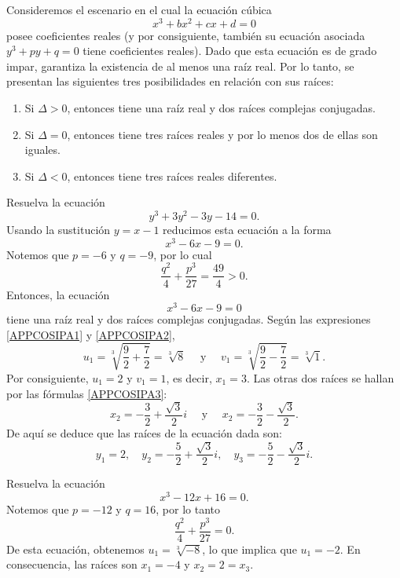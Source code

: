 \begin{observation}
    Consideremos el escenario en el cual la ecuación cúbica
    $$x^3+bx^2+cx+d=0$$
    posee coeficientes reales (y por consiguiente, también su ecuación asociada $y^3 + py + q=0$ tiene coeficientes reales). Dado que esta ecuación es de grado impar, garantiza la existencia de al menos una raíz real. Por lo tanto, se presentan las siguientes tres posibilidades en relación con sus raíces:\newpage
    \begin{enumerate}[label=\roman*.]
        \item Si $\Delta >0$, entonces tiene una raíz real y dos raíces complejas conjugadas.
        \item Si $\Delta =0$, entonces tiene tres raíces reales y por lo menos dos de ellas son iguales.
        \item Si $\Delta <0$, entonces tiene tres raíces reales diferentes.
    \end{enumerate}
\end{observation}

\begin{example}
    Resuelva la ecuación
    $$y^3+3y^2-3y-14=0.$$
    \solucion Usando la sustitución $y=x-1$ reducimos esta ecuación a la forma
    $$x^3-6x-9=0.$$
    Notemos que $p=-6$ y $q=-9$, por lo cual
    $$\frac{q^2}{4}+\frac{p^3}{27}=\frac{49}{4}>0.$$
    Entonces, la ecuación
    $$x^3-6x-9=0$$
    tiene una raíz real y dos raíces complejas conjugadas. Según las expresiones \eqref{APPCOSIPA1} y \eqref{APPCOSIPA2},
    $$u_1=\sqrt[3]{\frac{9}{2}+\frac{7}{2}}=\sqrt[3]{8} \quad \text{ y } \quad v_1=\sqrt[3]{\frac{9}{2}-\frac{7}{2}}=\sqrt[3]{1}.$$
    Por consiguiente, $u_1=2$ y $v_1=1$, es decir, $x_1=3$. Las otras dos raíces se hallan por las fórmulas \eqref{APPCOSIPA3}:
    $$x_2 = - \frac{3}{2} + \frac{\sqrt{3}}{2}i \quad \text{ y } \quad x_2 = - \frac{3}{2} - \frac{\sqrt{3}}{2}.$$
    De aquí se deduce que las raíces de la ecuación dada son:
    $$y_1 = 2, \quad y_2 = - \frac{5}{2} + \frac{\sqrt{3}}{2}i, \quad y_3 = - \frac{5}{2} - \frac{\sqrt{3}}{2}i.$$
\end{example}

\begin{example}
    Resuelva la ecuación
    $$x^3-12x+16=0.$$
    \solucion Notemos que $p=-12$ y $q=16$, por lo tanto
    $$\frac{q^2}{4}+\frac{p^3}{27}=0.$$
    De esta ecuación, obtenemos $u_1=\sqrt[3]{-8}$, lo que implica que $u_1=-2$. En consecuencia, las raíces son $x_1=-4$ y $x_2=2=x_3$.
\end{example}

